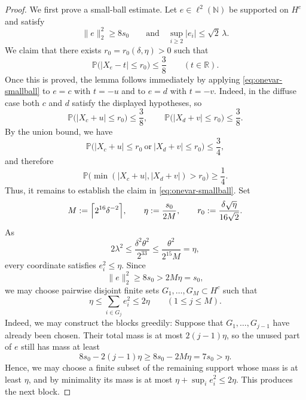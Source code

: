 \documentclass[11pt]{amsart}
\numberwithin{equation}{section}
\theoremstyle{definition}
\theoremstyle{remark}
\newcommand{\Prob}{\mathbb P}
\newcommand{\N}{\mathbb N}
\newcommand{\R}{\mathbb R}
\newcommand{\abs}[1]{\lvert #1 \rvert}
\newcommand{\norm}[1]{\lVert #1 \rVert}
\begin{document}
\begin{proof}
We first prove a small-ball estimate.  Let $e\in \ell^2(\N)$ be
supported on $H^c$ and satisfy
\[
\norm{e}_2^2\ge 8s_0
\qquad \text{and} \quad
\sup_{i\ge2}\abs{e_i}\le \sqrt2\,\lambda.
\]
	We claim that there exists $r_0=r_0(\delta,\eta)>0$ such that
\begin{equation}\label{eq:onevar-smallball}
\Prob\bigl(\abs{X_e-t}\le r_0\bigr)\le \frac38
\qquad(t\in\R).
\end{equation}
Once this is proved, the lemma follows immediately by applying
\eqref{eq:onevar-smallball} to $e=c$ with $t=-u$ and to $e=d$ with $t=-v$.
Indeed, in the diffuse case both $c$ and $d$ satisfy the displayed
hypotheses, so
\[
\Prob\bigl(\abs{X_c+u}\le r_0\bigr)\le \frac38,
\qquad
\Prob\bigl(\abs{X_d+v}\le r_0\bigr)\le \frac38.
\]
By the union bound, we have
\[
\Prob\bigl(\abs{X_c+u}\le r_0\ \text{or}\ \abs{X_d+v}\le r_0\bigr)
\le \frac34,
\]
and therefore
\[
\Prob\bigl(\min(\abs{X_c+u},\abs{X_d+v})>r_0\bigr)\ge \frac14.
\]
Thus, it remains to establish the claim in \eqref{eq:onevar-smallball}. 
Set
\[
M:=\Bigl\lceil 2^{16}\delta^{-2}\Bigr\rceil,
\qquad
\eta:=\frac{s_0}{2M},
\qquad
r_0:=\frac{\delta\sqrt{\eta}}{16\sqrt{2}}.
\]
	As
	\[
	2\lambda^2
	\le \frac{\delta^2\theta^2}{2^{33}}
	\le \frac{\theta^2}{2^{15}M}
	=\eta,
	\]
	every coordinate satisfies $e_i^2\le \eta$.  Since
\[
\norm{e}_2^2\ge 8s_0>2M\eta=s_0,
\]
we may choose pairwise disjoint finite sets $G_1,\dots,G_M\subset H^c$ such
that
\begin{equation}\label{eq:block-energy}
\eta\le \sum_{i\in G_j} e_i^2\le 2\eta
\qquad(1\le j\le M).
\end{equation}
Indeed, we may construct the blocks greedily:  Suppose that $G_1,\dots,G_{j-1}$ have
already been chosen.  Their total mass is at most $2(j-1)\eta$, so the
unused part of $e$ still has mass at least
\[
8s_0-2(j-1)\eta\ge 8s_0-2M\eta=7s_0> \eta.
\]
Hence, we may choose a finite subset of the remaining support whose mass is
at least $\eta$, and by minimality its mass is at most $\eta+\sup_i e_i^2
\le 2\eta$.  This produces the next block.
 

\end{proof}
\end{document}
